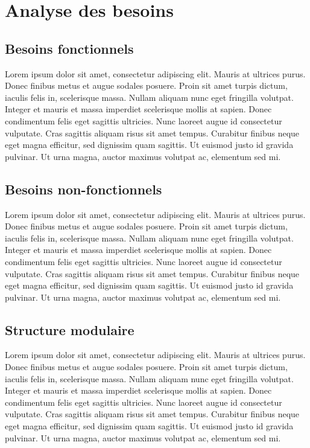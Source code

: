 \chapter{Analyse des besoins}
        \section{Besoins fonctionnels}
        Lorem ipsum dolor sit amet, consectetur adipiscing elit. Mauris at ultrices purus. Donec finibus metus et augue sodales posuere. Proin sit amet turpis dictum, iaculis felis in, scelerisque massa. Nullam aliquam nunc eget fringilla volutpat. Integer et mauris et massa imperdiet scelerisque mollis at sapien. Donec condimentum felis eget sagittis ultricies. Nunc laoreet augue id consectetur vulputate. Cras sagittis aliquam risus sit amet tempus. Curabitur finibus neque eget magna efficitur, sed dignissim quam sagittis. Ut euismod justo id gravida pulvinar. Ut urna magna, auctor maximus volutpat ac, elementum sed mi.
        \section{Besoins non-fonctionnels}
        Lorem ipsum dolor sit amet, consectetur adipiscing elit. Mauris at ultrices purus. Donec finibus metus et augue sodales posuere. Proin sit amet turpis dictum, iaculis felis in, scelerisque massa. Nullam aliquam nunc eget fringilla volutpat. Integer et mauris et massa imperdiet scelerisque mollis at sapien. Donec condimentum felis eget sagittis ultricies. Nunc laoreet augue id consectetur vulputate. Cras sagittis aliquam risus sit amet tempus. Curabitur finibus neque eget magna efficitur, sed dignissim quam sagittis. Ut euismod justo id gravida pulvinar. Ut urna magna, auctor maximus volutpat ac, elementum sed mi.
        \section{Structure modulaire}
        Lorem ipsum dolor sit amet, consectetur adipiscing elit. Mauris at ultrices purus. Donec finibus metus et augue sodales posuere. Proin sit amet turpis dictum, iaculis felis in, scelerisque massa. Nullam aliquam nunc eget fringilla volutpat. Integer et mauris et massa imperdiet scelerisque mollis at sapien. Donec condimentum felis eget sagittis ultricies. Nunc laoreet augue id consectetur vulputate. Cras sagittis aliquam risus sit amet tempus. Curabitur finibus neque eget magna efficitur, sed dignissim quam sagittis. Ut euismod justo id gravida pulvinar. Ut urna magna, auctor maximus volutpat ac, elementum sed mi.
